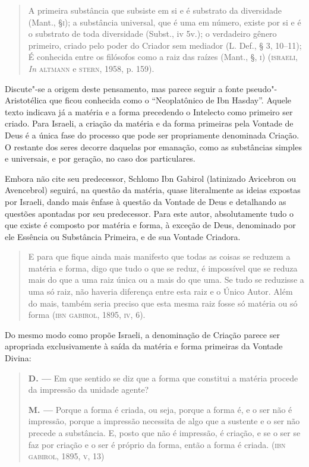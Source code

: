 \begin{quote}
A primeira substância que subsiste em si e é substrato da diversidade
(Mant., §\textsc{i}); a substância universal, que é uma em número, existe por
si e é o substrato de toda diversidade (Subst., iv 5v.); o verdadeiro
gênero primeiro, criado pelo poder do Criador sem mediador (L. Def.,
§ 3, 10--11); É conhecida entre os filósofos como a raiz das raízes
(Mant., §, \textsc{i}) (\textsc{israeli}, \emph{In} \textsc{altmann} e
\textsc{stern}, 1958, p. 159).
\end{quote}

Discute"-se a origem deste pensamento, mas parece seguir a fonte
pseudo"-Aristotélica que ficou conhecida como o “Neoplatônico de Ibn
Hasday”. Aquele texto indicava já a matéria e a forma precedendo o
Intelecto como primeiro ser criado. Para Israeli, a criação da
matéria e da forma primeiras pela Vontade de Deus é a única fase do
processo que pode ser propriamente denominada Criação. O restante dos
seres decorre daquelas por emanação, como as substâncias simples e
universais, e por geração, no caso dos particulares.

Embora não cite seu predecessor, Schlomo Ibn Gabirol (latinizado
Avicebron ou Avencebrol) seguirá, na questão da matéria, quase
literalmente as ideias expostas por Israeli, dando mais ênfase à
questão da Vontade de Deus e detalhando as questões apontadas por seu
predecessor. Para este autor, absolutamente tudo o que existe é
composto por matéria e forma, à exceção de Deus, denominado por ele
Essência ou Substância Primeira, e de sua Vontade Criadora. 

\begin{quote}
E para que fique ainda mais manifesto que todas as coisas se reduzem a
matéria e forma, digo que tudo o que se reduz, é impossível que se
reduza mais do que a uma raiz única ou a mais do que uma. Se tudo se
reduzisse a uma só raiz, não haveria diferença entre esta raiz e o
Único Autor. Além do mais, também seria preciso que esta mesma raiz
fosse só matéria ou só forma (\textsc{ibn} \textsc{gabirol}, 1895,
\textsc{iv}, 6).
\end{quote}

Do mesmo modo como propõe Israeli, a denominação de Criação parece ser
apropriada exclusivamente à saída da matéria e forma primeiras da
Vontade Divina:

\begin{quote}
\textbf{D. ---} Em que sentido se diz que a forma que constitui a
matéria procede da impressão da unidade agente?

\textbf{M. ---} Porque a forma é criada, ou seja, porque a
forma é, e o ser não é impressão, porque a impressão necessita de
algo que a sustente e o ser não precede a substância. E, posto que
não é impressão, é criação, e se o ser se faz por criação e o ser é
próprio da forma, então a forma é criada. (\textsc{ibn}
\textsc{gabirol}, 1895, \textsc{v}, 13)
\end{quote}


